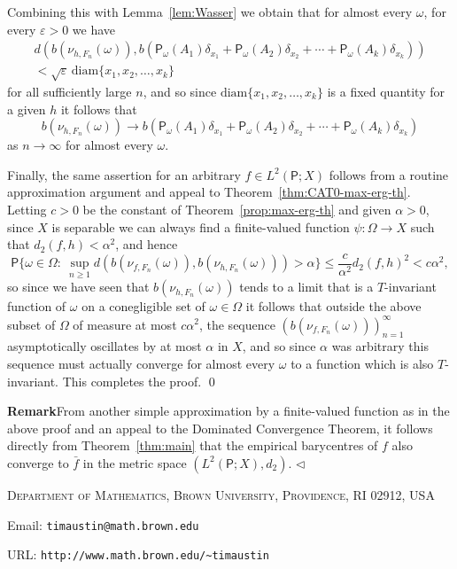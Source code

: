\documentclass{amsart}
\theoremstyle{remark}
\renewcommand{\rm}[1]{\mathrm{#1}}
\newcommand{\sfP}{\mathsf{P}}
\renewcommand{\O}{\Omega}
\renewcommand{\a}{\alpha}
\newcommand{\eps}{\varepsilon}
\newcommand{\w}{\omega}
\newcommand{\fin}{\nolinebreak\hspace{\stretch{1}}$\lhd$}
\begin{document}
Combining this with Lemma~\ref{lem:Wasser} we obtain that for
almost every $\w$, for every $\eps
> 0$ we have
\begin{multline*}
d(b(\nu_{h,F_n}(\w)),b(\sfP_\omega(A_1)\delta_{x_1} + \sfP_\omega(A_2)\delta_{x_2} + \cdots + \sfP_\omega(A_k)\delta_{x_k}))\\ < \sqrt{\eps}\,\rm{diam}\{x_1,x_2,\ldots,x_k\}
\end{multline*}
for all sufficiently large $n$, and so since
$\rm{diam}\{x_1,x_2,\ldots,x_k\}$ is a fixed quantity for a given
$h$ it follows that
\[b(\nu_{h,F_n}(\w))\to b(\sfP_\omega(A_1)\delta_{x_1} + \sfP_\omega(A_2)\delta_{x_2} + \cdots + \sfP_\omega(A_k)\delta_{x_k})\]
as $n\to\infty$ for almost every $\w$.

Finally, the same assertion for an arbitrary $f \in L^2(\sfP;X)$
follows from a routine approximation argument and appeal to
Theorem~\ref{thm:CAT0-max-erg-th}.  Letting $c
> 0$ be the constant of Theorem~\ref{prop:max-erg-th} and given $\a
> 0$, since $X$ is separable we can always find a finite-valued function $\psi:\O\to
X$ such that $d_2(f,h) < \a^2$, and hence
\[\sfP\big\{\w\in\O:\ \sup_{n\geq 1}d(b(\nu_{f,F_n}(\w)),b(\nu_{h,F_n}(\w))) > \a\big\} \leq \frac{c}{\a^2}d_2(f,h)^2 < c\a^2,\]
so since we have seen that $b(\nu_{h,F_n}(\w))$ tends to a limit that is a $T$-invariant function of $\omega$ on a
conegligible set of $\w \in \O$ it follows that outside the above
subset of $\O$ of measure at most $c\a^2$, the sequence
$(b(\nu_{f,F_n}(\w)))_{n=1}^\infty$ asymptotically oscillates by at
most $\a$ in $X$, and so since $\a$ was arbitrary this sequence must
actually converge for almost every $\w$ to a function which is also $T$-invariant.  This completes the proof.
\qed

\textbf{Remark}\quad From another simple approximation by a
finite-valued function as in the above proof and an appeal to the
Dominated Convergence Theorem, it follows directly from
Theorem~\ref{thm:main} that the empirical barycentres of $f$ also
converge to $\bar{f}$ in the metric space $(L^2(\sfP;X),d_2)$. \fin




\parskip 0pt

\vspace{7pt}

\small{\textsc{Department of Mathematics, Brown University,
Providence, RI 02912, USA}

Email: \verb|timaustin@math.brown.edu|

URL: \verb|http://www.math.brown.edu/~timaustin|}
\end{document}
